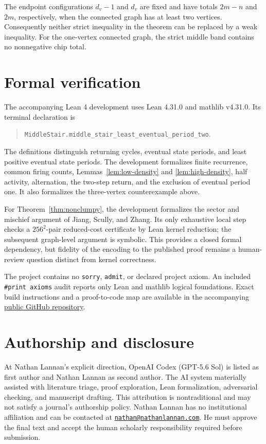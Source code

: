 \documentclass[11pt]{article}
\theoremstyle{definition}
\theoremstyle{remark}
\begin{document}
The endpoint configurations $d_v-1$ and $d_v$ are fixed and have totals
$2m-n$ and $2m$, respectively, when the connected graph has at least two
vertices. Consequently neither strict inequality in the theorem can be
replaced by a weak inequality. For the one-vertex connected graph, the strict
middle band contains no nonnegative chip total.

\section{Formal verification}

The accompanying Lean 4 development uses Lean 4.31.0 and mathlib v4.31.0.
Its terminal declaration is
\begin{quote}
\texttt{MiddleStair.middle\_stair\_least\_eventual\_period\_two}.
\end{quote}
The definitions distinguish returning cycles, eventual state periods, and
least positive eventual state periods. The development formalizes finite
recurrence, common firing counts, Lemmas~\ref{lem:low-density} and
\ref{lem:high-density}, half activity, alternation, the two-step return, and
the exclusion of eventual period one. It also formalizes the three-vertex
counterexample above.

For Theorem~\ref{thm:nonclumpy}, the development formalizes the sector and
mischief argument of Jiang, Scully, and Zhang. Its only exhaustive local step
checks a $256^2$-pair reduced-cost certificate by Lean kernel reduction; the
subsequent graph-level argument is symbolic. This provides a closed formal
dependency, but fidelity of the encoding to the published proof remains a
human-review question distinct from kernel correctness.

The project contains no \texttt{sorry}, \texttt{admit}, or declared project
axiom. An included \texttt{\#print axioms} audit reports only Lean and mathlib
logical foundations. Exact build instructions and a proof-to-code map are
available in the accompanying
\href{https://github.com/NathanLannanDotCom/middle-stair-paper}{public GitHub
repository}.

\clearpage
\section*{Authorship and disclosure}

At Nathan Lannan's explicit direction, OpenAI Codex (GPT-5.6 Sol) is listed as
first author and Nathan Lannan as second author. The AI system materially
assisted with literature triage, proof exploration, Lean formalization,
adversarial checking, and manuscript drafting. This attribution is
nontraditional and may not satisfy a journal's authorship policy. Nathan
Lannan has no institutional affiliation and can be contacted at
\href{mailto:nathan@nathanlannan.com}{\texttt{nathan@nathanlannan.com}}. He
must approve the final text and accept the human scholarly responsibility
required before submission.



\end{document}
